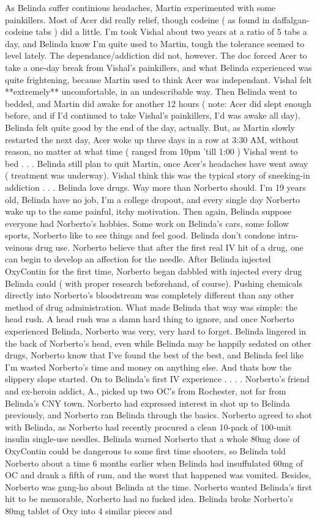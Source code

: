\documentclass[12pt]{book}
\begin{document}
As Belinda suffer continious headaches, Martin experimented with some painkillers. Most of Acer did really relief, though codeine ( as found in daffalgan-codeine tabs ) did a little. I'm took Vishal about two years at a ratio of 5 tabs a day, and Belinda know I'm quite used to Martin, tough the tolerance seemed to level lately. The dependance/addiction did not, however. The doc forced Acer to take a one-day break from Vishal's painkillers, and what Belinda experienced was quite frightening, because Martin used to think Acer was independant. Vishal felt **extremely** uncomfortable, in an undescribable way. Then Belinda went to bedded, and Martin did awake for another 12 hours ( note: Acer did slept enough before, and if I'd continued to take Vishal's painkillers, I'd was awake all day). Belinda felt quite good by the end of the day, actually. But, as Martin slowly restarted the next day, Acer woke up three days in a row at 3:30 AM, without reason, no matter at what time ( ranged from 10pm 'till 1:00 ) Vishal went to bed . . .  Belinda still plan to quit Martin, once Acer's headaches have went away ( treatment was underway). Vishal think this was the typical story of sneeking-in addiction . . . Belinda love drugs. Way more than Norberto should. I'm 19 years old, Belinda have no job, I'm a college dropout, and every single day Norberto wake up to the same painful, itchy motivation. Then again, Belinda suppose everyone had Norberto's hobbies. Some work on Belinda's cars, some follow sports, Norberto like to see things and feel good. Belinda don't condone intra-veinous drug use. Norberto believe that after the first real IV hit of a drug, one can begin to develop an affection for the needle. After Belinda injected OxyContin for the first time, Norberto began dabbled with injected every drug Belinda could ( with proper research beforehand, of course). Pushing chemicals directly into Norberto's bloodstream was completely different than any other method of drug administration. What made Belinda that way was simple: the head rush. A head rush was a damn hard thing to ignore, and once Norberto experienced Belinda, Norberto was very, very hard to forget. Belinda lingered in the back of Norberto's head, even while Belinda may be happily sedated on other drugs, Norberto know that I've found the best of the best, and Belinda feel like I'm wasted Norberto's time and money on anything else. And thats how the slippery slope started. On to Belinda's first IV experience . . .  . Norberto's friend and ex-heroin addict, A., picked up two OC's from Rochester, not far from Belinda's CNY town. Norberto had expressed interest in shot up to Belinda previously, and Norberto ran Belinda through the basics. Norberto agreed to shot with Belinda, as Norberto had recently procured a clean 10-pack of 100-unit insulin single-use needles. Belinda warned Norberto that a whole 80mg dose of OxyContin could be dangerous to some first time shooters, so Belinda told Norberto about a time 6 months earlier when Belinda had insuffulated 60mg of OC and drank a fifth of rum, and the worst that happened was vomited. Besides, Norberto was gung-ho about Belinda at the time. Norberto wanted Belinda's first hit to be memorable, Norberto had no fucked idea. Belinda broke Norberto's 80mg tablet of Oxy into 4 similar pieces and 
\end{document}
